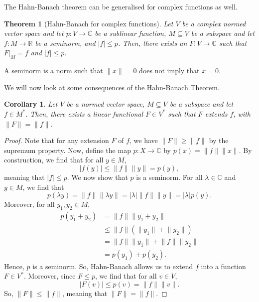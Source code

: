 \documentclass[a4paper, openany]{memoir}
\theoremstyle{definition}
\theoremstyle{plain}
\newtheorem{theorem}[definition]{Theorem}
\newtheorem{corollary}[definition]{Corollary}
\begin{document}
    \noindent The Hahn-Banach theorem can be generalised for complex functions as well.
    \begin{theorem}[Hahn-Banach for complex functions]
        Let $V$ be a complex normed vector space and let $p \colon V \to \mathbb{C}$ be a sublinear function, $M \subseteq V$ be a subspace and let $f \colon M \to \mathbb{R}$ be a seminorm, and $|f| \leq p$. Then, there exists an $F \colon V \to \mathbb{C}$ such that $F|_M = f$ and $|f| \leq p$.
    \end{theorem}
    \noindent A seminorm is a norm such that $\lVert x \rVert = 0$ does not imply that $x = 0$.

    We will now look at some consequences of the Hahn-Banach Theorem.
    \begin{corollary}
        Let $V$ be a normed vector space, $M \subseteq V$ be a subspace and let $f \in M^*$. Then, there exists a linear functional $F \in V^*$ such that $F$ extends $f$, with $\lVert F \rVert = \lVert f \rVert$.
    \end{corollary}
    \begin{proof}
        Note that for any extension $F$ of $f$, we have $\lVert F \rVert \geq \lVert f \rVert$ by the supremum property. Now, define the map $p \colon X \to \mathbb{C}$ by $p(x) = \lVert f \rVert \lVert x \rVert$. By construction, we find that for all $y \in M$, 
        \[|f(y)| \leq \lVert f \rVert \lVert y \rVert = p(y),\]
        meaning that $|f| \leq p$. We now show that $p$ is a seminorm. For all $\lambda \in \mathbb{C}$ and $y \in M$, we find that
        \[p(\lambda y) = \lVert f \rVert \lVert \lambda y \rVert = |\lambda| \lVert f \rVert \lVert y \rVert = |\lambda| p(y).\]
        Moreover, for all $y_1, y_2 \in M$,
        \begin{align*}
            p(y_1 + y_2) &= \lVert f \rVert \lVert y_1 + y_2 \rVert \\
            &\leq \lVert f \rVert (\lVert y_1 \rVert + \lVert y_2 \rVert) \\
            &= \lVert f \rVert \lVert y_1 \rVert + \lVert f \rVert \lVert y_2 \rVert \\
            &= p(y_1) + p(y_2).
        \end{align*}
        Hence, $p$ is a seminorm. So, Hahn-Banach allows us to extend $f$ into a function $F \in V^*$. Moreover, since $F \leq p$, we find that for all $v \in V$,
        \[|F(v)| \leq p(v) = \lVert f \rVert \lVert v \rVert.\]
        So, $\lVert F \rVert \leq \lVert f \rVert$, meaning that $\lVert F \rVert = \lVert f \rVert$.
    \end{proof}
\end{document}
